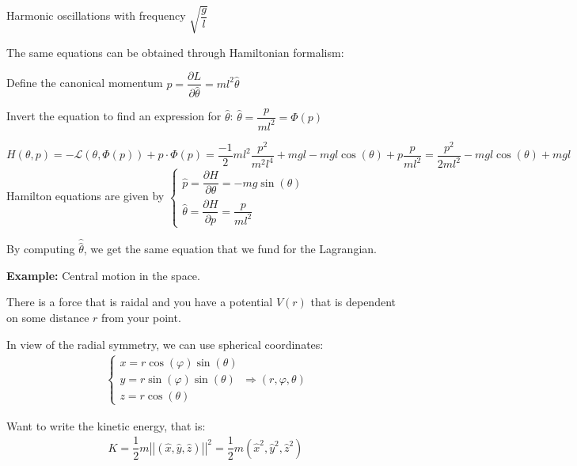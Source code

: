 \noindent Harmonic oscillations with frequency $\sqrt{\dfrac{g}{l}}$
\par\bigskip
\noindent The same equations can be obtained through Hamiltonian formalism: \par
\noindent Define the canonical momentum $p = \dfrac{\partial L}{\partial \hat{\theta}} = ml^2\hat{\theta}$\par
\noindent Invert the equation to find an expression for $\hat{\theta}$: $\hat{\theta} = \dfrac{p}{ml^2} =\Phi(p)$\par
\noindent $H(\theta, p) = -\mathcal{L}(\theta, \Phi(p)) + p\cdot \Phi(p)= \dfrac{-1}{2}ml^2\dfrac{p^2}{m^2l^4}+mgl-mgl\cos(\theta)+p\dfrac{p}{ml^2} = \dfrac{p^2}{2ml^2}-mgl\cos(\theta)+mgl$
\noindent Hamilton equations are given by $
\begin{cases*}
  \hat{p} = \dfrac{\partial H}{\partial \theta} = -mg\sin(\theta)\\\hat{\theta} = \dfrac{\partial H}{\partial p} = \dfrac{p}{ml^2}
\end{cases*}$
\par\bigskip
\noindent By computing $\hat{\hat{\theta}}$, we get the same equation that we fund for the Lagrangian.
\par\bigskip
\noindent\textbf{Example:} Central motion in the space.\par
\noindent There is a force that is raidal and you have a potential $V(r)$ that is dependent on some distance $r$ from your point.\par
\noindent In view of the radial symmetry, we can use spherical coordinates:
\begin{equation*}
  \begin{gathered}
    \begin{cases*}
      x = r\cos(\varphi)\sin(\theta)\\
      y = r\sin(\varphi)\sin(\theta)\\
      z = r\cos(\theta)
    \end{cases*}\Rightarrow (r,\varphi,\theta)
  \end{gathered}
\end{equation*}
\par\bigskip
\noindent Want to write the kinetic energy, that is:
\begin{equation*}
  \begin{gathered}
    K = \dfrac{1}{2}m\left|\left|(\hat{x},\hat{y},\hat{z})\right|\right|^2 = \dfrac{1}{2}m(\hat{x}^2,\hat{y}^2,\hat{z}^2)
  \end{gathered}
\end{equation*}
